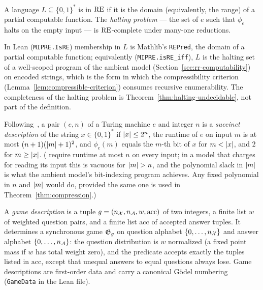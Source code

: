 \begin{definition}
\label{def:re}
\leanok
A language $L \subseteq \{0,1\}^*$ is in $\mathrm{RE}$ if it is the domain (equivalently, the
range) of a partial computable function. The \emph{halting problem} --- the set of $e$
such that $\phi_e$ halts on the empty input --- is $\mathrm{RE}$-complete under many-one
reductions.
\end{definition}

In Lean (\texttt{MIPRE.IsRE}) membership in $L$ is Mathlib's \texttt{REPred}, the domain
of a partial computable function; equivalently (\texttt{MIPRE.isRE\_iff}), $L$ is the
halting set of a well-scoped program of the ambient model
(Section~\ref{sec:rr-computability}) on encoded strings, which is the form in which the
compressibility criterion (Lemma~\ref{lem:compressible-criterion}) consumes recursive
enumerability. The completeness of the halting problem is
Theorem~\ref{thm:halting-undecidable}, not part of the definition.

\begin{definition}
\label{def:succinct}
\leanok
Following~\cite{MNY}, a pair $(e, n)$ of a Turing machine $e$ and integer $n$ is a
\emph{succinct description} of the string $x \in \{0,1\}^*$ if $\left\vert {x} \right\vert \leq 2^n$, the
runtime of $e$ on input $m$ is at most $(n+1)(\left\vert {m} \right\vert+1)^2$, and $\phi_e(m)$ equals the
$m$-th bit of $x$ for $m < \left\vert {x} \right\vert$, and $2$ for $m \geq \left\vert {x} \right\vert$. (\cite{MNY} require
runtime at most $n$ on every input; in a model that charges for reading its input this is
vacuous for $\left\vert {m} \right\vert > n$, and the polynomial slack in $\left\vert {m} \right\vert$ is what the ambient
model's bit-indexing program achieves. Any fixed polynomial in $n$ and $\left\vert {m} \right\vert$ would
do, provided the same one is used in Theorem~\ref{thm:compression}.)
\end{definition}

\begin{definition}
\label{def:game-description}
\leanok
A \emph{game description} is a tuple $g = (n_{\mathcal{X}}, n_{\mathcal{A}}, w, \mathrm{acc})$ of two
integers, a finite list $w$ of weighted question pairs, and a finite list
$\mathrm{acc}$ of accepted answer tuples. It determines a synchronous game
$\mathfrak{G}_g$ on question alphabet $\{0, \ldots, n_{\mathcal{X}}\}$ and answer alphabet $\{0, \ldots,
n_{\mathcal{A}}\}$: the question distribution is $w$ normalized (a fixed point mass if $w$ has
total weight zero), and the predicate accepts exactly the tuples listed in
$\mathrm{acc}$, except that unequal answers to equal questions always lose. Game
descriptions are first-order data and carry a canonical G\"odel numbering
(\texttt{GameData} in the Lean file).
\end{definition}

